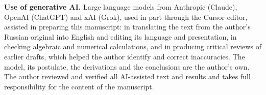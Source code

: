 \documentclass[11pt,a4paper]{article}
\begin{document}
\noindent\textbf{Use of generative AI.} Large language models from Anthropic (Claude), OpenAI (ChatGPT) and xAI (Grok), used in part through the Cursor editor, assisted in preparing this manuscript: in translating the text from the author's Russian original into English and editing its language and presentation, in checking algebraic and numerical calculations, and in producing critical reviews of earlier drafts, which helped the author identify and correct inaccuracies. The model, its postulate, the derivations and the conclusions are the author's own. The author reviewed and verified all AI-assisted text and results and takes full responsibility for the content of the manuscript.
\end{document}
